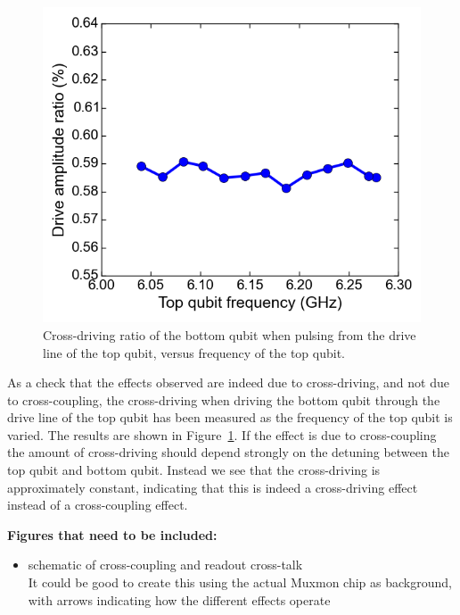       \begin{figure}
        \begin{center}
        \vspace{-30pt}
          \includegraphics[width=\textwidth]{../Figures/Exploring frequency re-use/cross-driving_vs_top_frequency.png}
        \end{center}
        \vspace{-20 pt}
        \caption{Cross-driving ratio of the bottom qubit when pulsing from the drive line of the top qubit, versus frequency of the top qubit. }
        \label{fig:cross-driving versus top frequency}
      \end{figure}

      As a check that the effects observed are indeed due to cross-driving, and not due to cross-coupling, the cross-driving when driving the bottom qubit through the drive line of the top qubit has been measured as the frequency of the top qubit is varied. The results are shown in Figure~\ref{fig:cross-driving versus top frequency}. If the effect is due to cross-coupling the amount of cross-driving should depend strongly on the detuning between the top qubit and bottom qubit. Instead we see that the cross-driving is approximately constant, indicating that this is indeed a cross-driving effect instead of a cross-coupling effect.


    \textbf{Figures that need to be included:}
    \begin{itemize}
      \item schematic of cross-coupling and readout cross-talk \\
          It could be good to create this using the actual Muxmon chip as background, with arrows indicating how the different effects operate
    \end{itemize}




